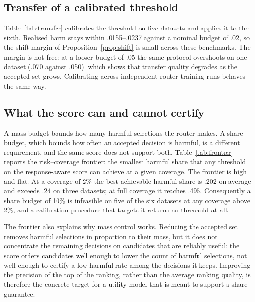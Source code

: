 

\subsection{Transfer of a calibrated threshold}

Table~\ref{tab:transfer} calibrates the threshold on five datasets and applies
it to the sixth. Realised harm stays within .0155--.0237 against a nominal
budget of .02, so the shift margin of Proposition~\ref{prop:shift} is small
across these benchmarks. The margin is not free: at a looser budget of .05 the
same protocol overshoots on one dataset (.070 against .050), which shows that
transfer quality degrades as the accepted set grows. Calibrating across
independent router training runs behaves the same way.



\subsection{What the score can and cannot certify}

A mass budget bounds how many harmful selections the router makes. A share
budget, which bounds how often an accepted decision is harmful, is a different
requirement, and the same score does not support both. Table~\ref{tab:frontier}
reports the risk--coverage frontier: the smallest harmful share that any
threshold on the response-aware score can achieve at a given coverage. The
frontier is high and flat. At a coverage of 2\% the best achievable harmful
share is .202 on average and exceeds .24 on three datasets; at full coverage it
reaches .495. Consequently a share budget of 10\% is infeasible on five of the
six datasets at any coverage above 2\%, and a calibration procedure that
targets it returns no threshold at all.



The frontier also explains why mass control works. Reducing the accepted set
removes harmful selections in proportion to their mass, but it does not
concentrate the remaining decisions on candidates that are reliably useful:
the score orders candidates well enough to lower the count of harmful
selections, not well enough to certify a low harmful rate among the decisions
it keeps. Improving the precision of the top of the ranking, rather than the
average ranking quality, is therefore the concrete target for a utility model
that is meant to support a share guarantee.

